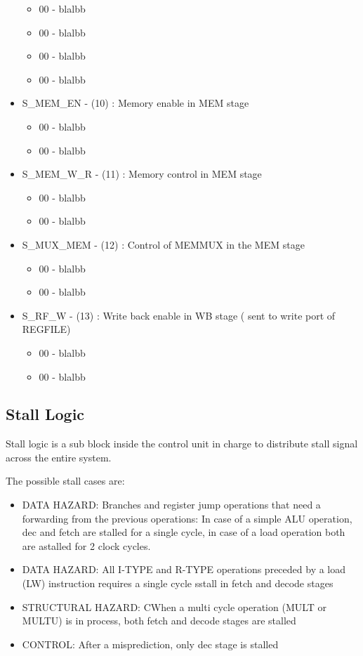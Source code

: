 \documentclass[12pt]{article}
\begin{document}
\begin{itemize}
	\begin{itemize}
		\item 00 - blalbb 
		\item 00 - blalbb
		\item 00 - blalbb
		\item 00 - blalbb
	\end{itemize}
	\item S\_MEM\_EN - (10) : Memory enable in MEM stage
	\begin{itemize}
		\item 00 - blalbb 
		\item 00 - blalbb
	\end{itemize}
		\item S\_MEM\_W\_R - (11) : Memory control in MEM stage
	\begin{itemize}
		\item 00 - blalbb 
		\item 00 - blalbb
	\end{itemize}
	\item S\_MUX\_MEM - (12) : Control of MEMMUX in the MEM stage
	\begin{itemize}
		\item 00 - blalbb 
		\item 00 - blalbb
	\end{itemize}
	\item S\_RF\_W - (13) : Write back enable in WB stage ( sent to write port of REGFILE)
	\begin{itemize}
		\item 00 - blalbb 
		\item 00 - blalbb
	\end{itemize}
	
\end{itemize}


\subsection{Stall Logic}

Stall logic is a sub block inside the control unit in charge to distribute stall signal across the entire system.

The possible stall cases are:
\begin{itemize}
	\item DATA HAZARD: Branches and register jump operations that need a forwarding from the previous operations: In case of a simple ALU operation, dec and fetch are stalled for a single cycle, in case of a load operation both are astalled for 2 clock cycles.
	\item DATA HAZARD: All I-TYPE and R-TYPE operations preceded by a load (LW) instruction requires a single cycle sstall in fetch and decode stages
	\item STRUCTURAL HAZARD: CWhen a multi cycle operation (MULT or MULTU) is in process, both fetch and decode stages are stalled
	\item CONTROL: After a misprediction, only dec stage is stalled  
\end{itemize}
\end{document}
